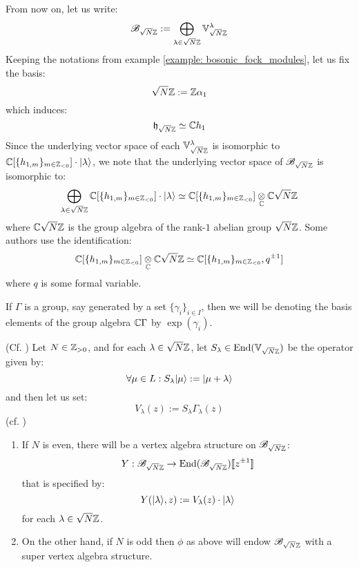             \begin{convention}
                From now on, let us write:
                    $$\mathscr{B}_{\sqrt{N}\mathbb{Z}} := \bigoplus_{\lambda \in \sqrt{N} \mathbb{Z}} \mathbb{V}_{\sqrt{N} \mathbb{Z}}^{\lambda}$$
                Keeping the notations from example \ref{example: bosonic_fock_modules}, let us fix the basis:
                    $$\sqrt{N} \mathbb{Z} := \mathbb{Z} \alpha_1$$
                which induces:
                    $$\mathfrak{h}_{\sqrt{N} \mathbb{Z}} \simeq \mathbb{C} h_1$$
                Since the underlying vector space of each $\mathbb{V}_{\sqrt{N} \mathbb{Z}}^{\lambda}$ is isomorphic to $\mathbb{C}[\{h_{1, m}\}_{m \in \mathbb{Z}_{< 0}}] \cdot \lvert {\lambda} \rangle$, we note that the underlying vector space of $\mathscr{B}_{\sqrt{N} \mathbb{Z}}$ is isomorphic to:
                    $$\bigoplus_{\lambda \in \sqrt{N} \Z} \bbC[\{h_{1, m}\}_{m \in \Z_{< 0}}] \cdot \ket{\lambda} \cong \bbC[\{h_{1, m}\}_{m \in \Z_{< 0}}] \tensor_{\bbC} \bbC \sqrt{N} \Z$$
                where $\mathbb{C} \sqrt{N} \mathbb{Z}$ is the group algebra of the rank-$1$ abelian group $\sqrt{N} \mathbb{Z}$. Some authors use the identification:
                    $$\bbC[\{h_{1, m}\}_{m \in \Z_{< 0}}] \tensor_{\bbC} \bbC \sqrt{N} \Z \cong \bbC[\{h_{1, m}\}_{m \in \Z_{< 0}}, q^{\pm 1}]$$
                where $q$ is some formal variable.
            \end{convention}
            \begin{convention}
                If $\Gamma$ is a group, say generated by a set $\{\gamma_i\}_{i \in I}$, then we will be denoting the basis elements of the group algebra $\mathbb{C}\Gamma$ by $\exp(\gamma_i)$.
            \end{convention}
            \begin{theorem} \label{theorem: rank_1_bosonic_vertex_operators}
                (Cf. \cite[Proposition 5.2.5]{frenkel_ben_zvi_vertex_algebras_and_algebraic_curves}) Let $N \in \mathbb{Z}_{> 0}$, and for each $\lambda \in \sqrt{N} \mathbb{Z}$, let $S_{\lambda} \in \mathrm{End}(\mathbb{V}_{\sqrt{N} \mathbb{Z}})$ be the operator given by:
                    $$\forall \mu \in L: S_{\lambda} \lvert {\mu} \rangle := \lvert {\mu + \lambda} \rangle$$
                and then let us set:
                    $$V_{\lambda}(z) := S_{\lambda} \Gamma_{\lambda}(z)$$
                (cf. \cite[Equation 5.2.8, p. 83]{frenkel_ben_zvi_vertex_algebras_and_algebraic_curves})
                \begin{enumerate}
                    \item If $N$ is even, there will be a vertex algebra structure on $\mathscr{B}_{\sqrt{N} \mathbb{Z}}$:
                        $$Y: \mathscr{B}_{\sqrt{N} \mathbb{Z}} \to \mathrm{End}(\mathscr{B}_{\sqrt{N} \mathbb{Z}})[\![z^{\pm 1}]\!]$$
                    that is specified by:
                        $$Y(\lvert {\lambda} \rangle, z) := V_{\lambda}(z) \cdot \lvert {\lambda} \rangle$$
                    for each $\lambda \in \sqrt{N} \mathbb{Z}$.
                    \item On the other hand, if $N$ is odd then $\phi$ as above will endow $\mathscr{B}_{\sqrt{N} \mathbb{Z}}$ with a super vertex algebra structure.
                \end{enumerate}
            \end{theorem}
